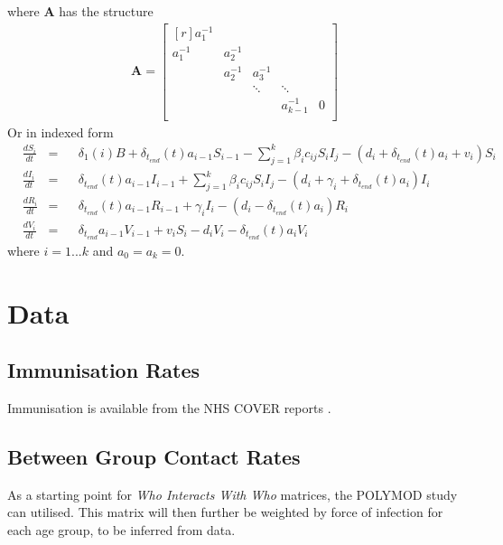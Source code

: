 \documentclass{article}
\theoremstyle{definition}
\begin{document}
  where $\mathbf{A}$ has the structure
\begin{gather*}
\mathbf{A}=\begin{bmatrix}[r]
 a_1^{-1} &           &           &              &   \\
 a_1^{-1} &  a_2^{-1} &           &              &   \\
          &  a_2^{-1} & a_3^{-1}  &              &   \\
          &           & \ddots    & \ddots       &   \\
          &           &		        & a_{k-1}^{-1} & 0 \\
\end{bmatrix}
\end{gather*}
Or in indexed form
\begin{align*}
  &\frac{dS_{i}}{dt}&=&&\delta_1(i)B + \delta_{t_{end}}(t)a_{i-1}S_{i-1}-\sum_{j=1}^{k}\beta_{i}c_{ij}S_{i}I_{j}-(d_{i} + \delta_{t_{end}}(t)a_{i} + v_{i})S_{i}\\
  &\frac{dI_{i}}{dt} &=&&\delta_{t_{end}}(t)a_{i-1}I_{i-1}+\sum_{j=1}^{k}\beta_{i}c_{ij}S_{i}I_{j}-(d_{i}+\gamma_{i}+\delta_{t_{end}}(t)a_{i})I_{i}\\
  &\frac{dR_{i}}{dt} &=&& \delta_{t_{end}}(t)a_{i-1}R_{i-1}+\gamma_{i}I_{i}-(d_{i}-\delta_{t_{end}}(t)a_{i})R_{i}\\
  &\frac{dV_{i}}{dt} &=&& \delta_{t_{end}}a_{i-1}V_{i-1}+v_iS_i-d_{i}V_{i}-\delta_{t_{end}}(t)a_{i}V_{i}
\end{align*}
where $i=1...k$ and $a_0 = a_k = 0$.
\section{Data}
\subsection{Immunisation Rates}
Immunisation is available from the NHS COVER reports \cite{noauthor_childhood_nodate}.
\subsection{Between Group Contact Rates}
As a starting point for \emph{Who Interacts With Who} matrices, the POLYMOD study \cite{mossong_social_2008} can utilised. This matrix will then further be weighted by force of infection for each age group, to be inferred from data.
\end{document}
